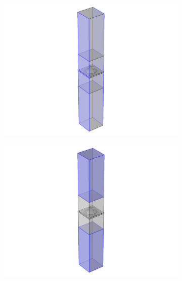 \begin{figure}[htb]
    \begin{subfigure}{0.19\textwidth}
        \centering
        \includegraphics[width=1\linewidth, trim=55cm 0 45cm 0cm, clip]{figures/ch4/implem/ewfd/ewfd_pc2__.png}
        \caption{}
        \label{fig:implementation_ewfd_pc2}
    \end{subfigure}
    \begin{subfigure}{0.19\textwidth}
        \centering
        \includegraphics[width=1\linewidth, trim=55cm 0 45cm 0cm, clip]{figures/ch4/implem/ewfd/ewfd_pml__.png}
        \caption{}
        \label{fig:implementation_ewfd_pml}
    \end{subfigure}
    \begin{subfigure}{0.19\textwidth}

\end{subfigure}
\end{figure}
